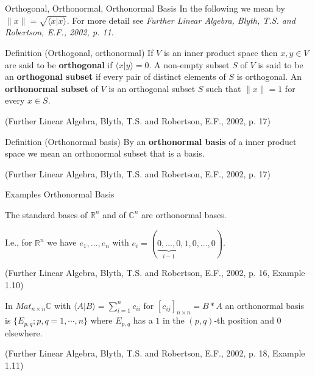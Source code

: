 \documentclass{beamer}
\begin{document}
\begin{frame}{Orthogonal, Orthonormal, Orthonormal Basis}
    \tiny
    In the following we mean by $\| x \| = \sqrt{\langle x | x \rangle}$. For more detail see \emph{Further Linear Algebra, Blyth, T.S. and Robertson, E.F., 2002, p. 11}.
    \normalsize
    
    \pause
    
    \begin{block}{Definition (Orthogonal, orthonormal)}
        If $V$ is an inner product space then $x,y \in V$ are said to be \textbf{orthogonal} if $\langle x | y \rangle = 0$. A non-empty subset $S$ of $V$ is said to be an \textbf{orthogonal subset} if every pair of distinct elements of $S$ is orthogonal. An \textbf{orthonormal subset} of $V$ is an orthogonal subset $S$ such that $\| x \| = 1$ for every $x \in S$.
        \par \vspace{1mm} (Further Linear Algebra, Blyth, T.S. and Robertson, E.F., 2002, p. 17)
    \end{block}
    
    \pause
    
    \begin{block}{Definition (Orthonormal basis)}
        By an \textbf{orthonormal basis} of a inner product space we mean an orthonormal subset that is a basis.
        \par \vspace{1mm} (Further Linear Algebra, Blyth, T.S. and Robertson, E.F., 2002, p. 17)
    \end{block}
\end{frame}

\begin{frame}{Examples Orthonormal Basis}
    \begin{example}[I]
        The standard bases of $\mathbb{R}^n$ and of $\mathbb{C}^n$ are orthonormal bases.\par
        I.e., for $\mathbb{R}^n$ we have ${e_1, \dots, e_n}$ with $e_i = (\underbrace{0, \dots, 0}_{i-1}, 1, 0,  \dots, 0)$.
        \par \vspace{1mm} (Further Linear Algebra, Blyth, T.S. and Robertson, E.F., 2002, p. 16, Example 1.10)
    \end{example}
    
    \pause
    
    \begin{example}[II]
        In $Mat_{n \times n}\mathbb{C}$ with $\langle A | B \rangle = \sum_{i=1}^{n}c_{ii}$ for $[c_{ij}]_{n \times n} = B\!*\!A$ an orthonormal basis is $\{E_{p,q} ; p, q = 1, \cdots, n\}$ where $E_{p,q}$ has a $1$ in the $(p,q)$-th position and $0$ elsewhere.
        \par \vspace{3mm} (Further Linear Algebra, Blyth, T.S. and Robertson, E.F., 2002, p. 18, Example 1.11)
    \end{example}
\end{frame}
\end{document}
